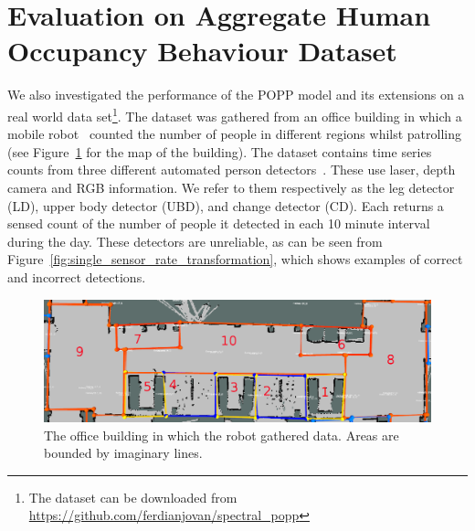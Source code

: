 
\section{Evaluation on Aggregate Human Occupancy Behaviour Dataset}
\label{sec:evareal}

We also investigated the performance of the POPP model and its extensions on a real world data set\footnote{The dataset can be downloaded from \url{https://github.com/ferdianjovan/spectral_popp}}.
% 
The dataset was gathered from an office building in which a mobile robot~\cite{hawes2016strands} counted the number of people in different regions whilst patrolling (see Figure~\ref{fig:map_popp_independent_test} for the map of the building). The dataset contains time series  counts from three different automated person detectors~\cite{dondrup2015real}. These use laser, depth camera and RGB information. We refer to them respectively as the leg detector (LD), upper body detector (UBD), and change detector (CD). Each returns a sensed count of the number of people it detected in each 10 minute interval during the day. These detectors are unreliable, as can be seen from Figure~\ref{fig:single_sensor_rate_transformation}, which shows examples of correct and incorrect detections.

\begin{figure}[t]
	\centering
	\includegraphics[width=0.95\columnwidth]{./figures/map_popp.png}
	\caption{The office building in which the robot gathered data. Areas are bounded by imaginary lines.}
	\label{fig:map_popp_independent_test}
\end{figure}

